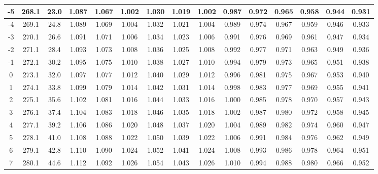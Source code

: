 \documentclass[12pt,a4paper,twoside]{article}
\begin{document}
\begin{center}
\begin{longtable}{ c c c | c c c c c c c c c c c c}
 -5 & 268.1 & 23.0 & 1.087 & 1.067 & 1.002 & 1.030 & 1.019 & 1.002 & 0.987 & 0.972 & 0.965 & 0.958 & 0.944 & 0.931 \\ \hline   
 
 -4 & 269.1 & 24.8 & 1.089 & 1.069 & 1.004 & 1.032 & 1.021 & 1.004 & 0.989 & 0.974 & 0.967 & 0.959 & 0.946 & 0.933 \\ \hline   
 
 -3 & 270.1 & 26.6 & 1.091 & 1.071 & 1.006 & 1.034 & 1.023 & 1.006 & 0.991 & 0.976 & 0.969 & 0.961 & 0.947 & 0.934 \\ \hline   
 
 -2 & 271.1 & 28.4 & 1.093 & 1.073 & 1.008 & 1.036 & 1.025 & 1.008 & 0.992 & 0.977 & 0.971 & 0.963 & 0.949 & 0.936 \\ \hline   
 
 -1 & 272.1 & 30.2 & 1.095 & 1.075 & 1.010 & 1.038 & 1.027 & 1.010 & 0.994 & 0.979 & 0.973 & 0.965 & 0.951 & 0.938 \\ \hline   
 
 0 & 273.1 & 32.0 & 1.097 & 1.077 & 1.012 & 1.040 & 1.029 & 1.012 & 0.996 & 0.981 & 0.975 & 0.967 & 0.953 & 0.940 \\ \hline   
 
 1 & 274.1 & 33.8 & 1.099 & 1.079 & 1.014 & 1.042 & 1.031 & 1.014 & 0.998 & 0.983 & 0.977 & 0.969 & 0.955 & 0.941 \\ \hline   
 
 2 & 275.1 & 35.6 & 1.102 & 1.081 & 1.016 & 1.044 & 1.033 & 1.016 & 1.000 & 0.985 & 0.978 & 0.970 & 0.957 & 0.943 \\ \hline   
 
 3 & 276.1 & 37.4 & 1.104 & 1.083 & 1.018 & 1.046 & 1.035 & 1.018 & 1.002 & 0.987 & 0.980 & 0.972 & 0.958 & 0.945 \\ \hline   
 
 4 & 277.1 & 39.2 & 1.106 & 1.086 & 1.020 & 1.048 & 1.037 & 1.020 & 1.004 & 0.989 & 0.982 & 0.974 & 0.960 & 0.947 \\ \hline   
 
 5 & 278.1 & 41.0 & 1.108 & 1.088 & 1.022 & 1.050 & 1.039 & 1.022 & 1.006 & 0.991 & 0.984 & 0.976 & 0.962 & 0.949 \\ \hline   
 
 6 & 279.1 & 42.8 & 1.110 & 1.090 & 1.024 & 1.052 & 1.041 & 1.024 & 1.008 & 0.993 & 0.986 & 0.978 & 0.964 & 0.951 \\ \hline   
 
 7 & 280.1 & 44.6 & 1.112 & 1.092 & 1.026 & 1.054 & 1.043 & 1.026 & 1.010 & 0.994 & 0.988 & 0.980 & 0.966 & 0.952 \\ \hline   
 

\end{longtable}
\end{center}
\end{document}
